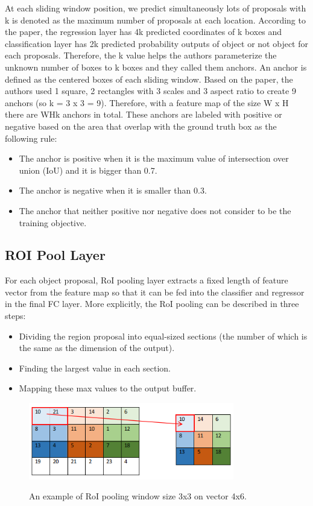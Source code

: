 	At each sliding window position, we predict simultaneously lots of proposals with k is denoted as the maximum number of proposals at each location. According to the paper, the regression layer has 4k predicted coordinates of k boxes and classification layer has 2k predicted probability outputs of object or not object for each proposals. Therefore, the k value helps the authors parameterize the unknown number of boxes to k boxes and they called them anchors. 
	An anchor is defined as the centered boxes of each sliding window. Based on the paper, the authors used 1 square, 2 rectangles with 3 scales and 3 aspect ratio to create 9 anchors (so k = 3 x 3 = 9). Therefore, with a feature map of the size W x H there are WHk anchors in total. These anchors are labeled with positive or negative based on the area that overlap with the ground truth box as the following rule:
	\begin{itemize}
		\item The anchor is positive when it is the maximum value of intersection over union (IoU) and it is bigger than 0.7.
		\item The anchor is negative when it is smaller than 0.3.
		\item The anchor that neither positive nor negative does not consider to be the training objective.
	\end{itemize}
	
\subsection{ROI Pool Layer}
\label{subsection:roi_pool}
\noindent	
	
	For each object proposal, RoI pooling layer extracts a fixed length of feature vector from the feature map so that it can be fed into the classifier and regressor in the final FC layer. More explicitly, the RoI pooling can be described in three steps:
	\begin{itemize}
		\item Dividing the region proposal into equal-sized sections (the number of which is the same as the dimension of the output).
		\item Finding the largest value in each section.
		\item Mapping these max values to the output buffer.
	\end{itemize}
	
	\begin{figure}[H]
		\centering
		{\includegraphics[width=0.8\textwidth]{./hinhanh/chap4/roi_quantization.png}}
		\caption{An example of RoI pooling window size 3x3 on vector 4x6.}
		\label{fig:roi_quantization}
	\end{figure}
	
